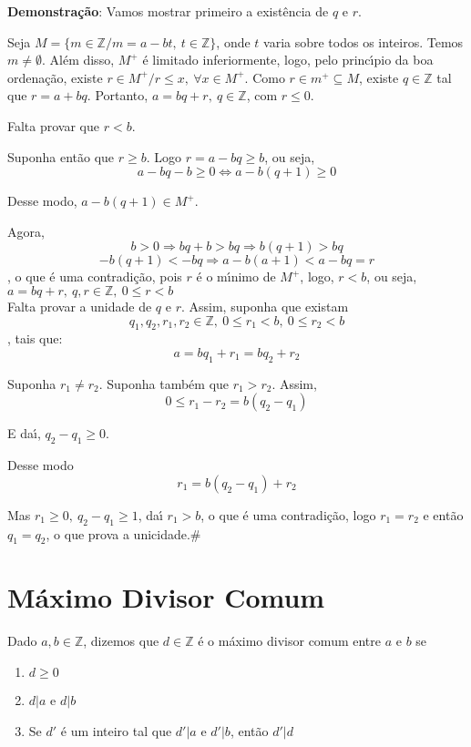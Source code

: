 \textbf{Demonstra{\c c}{\~a}o}: Vamos mostrar primeiro a exist{\^e}ncia de $q$ e $r$.

Seja $M=\{m\in\mathbb{Z}/m=a-bt,\ t\in\mathbb{Z}\}$, onde $t$ varia sobre todos os inteiros. Temos $m\neq\emptyset$. Al{\'e}m disso, $M^{+}$ {\'e} limitado inferiormente, logo, pelo princ{\'\i}pio da boa ordena{\c c}{\~a}o, existe $r\in M^{+}/r\leq x,\ \forall x\in M^{+}$. Como $r\in m^{+}\subseteq M$, existe $q\in\mathbb{Z}$ tal que $r=a+bq$. Portanto, $a=bq+r,\ q\in\mathbb{Z}$, com $r\leq 0$.

Falta provar que $r<b$.

Suponha ent{\~a}o que $r\geq b$. Logo $r=a-bq\geq b$, ou seja,\[a-bq-b\geq 0\Leftrightarrow a-b(q+1)\geq 0\]

Desse modo, $a-b(q+1)\in M^{+}$.

Agora, \[b>0\Rightarrow bq+b>bq\Rightarrow b(q+1)>bq\] \[-b(q+1)<-bq\Rightarrow a-b(a+1)<a-bq=r\], o que {\'e} uma contradi{\c c}{\~a}o, pois $r$ {\'e} o m{\'\i}nimo de $M^{+}$, logo, $r<b$, ou seja, $a=bq+r,\ q,r\in\mathbb{Z},\ 0\leq r<b$\\

Falta provar a unidade de $q$ e $r$. Assim, suponha que existam \[q_{1},q_{2},r_{1},r_{2}\in\mathbb{Z},\ 0\leq r_{1}<b,\ 0\leq r_{2}<b\], tais que:
\[a=bq_{1}+r_{1}=bq_{2}+r_{2}\]

Suponha $r_{1}\neq r_{2}$. Suponha tamb{\'e}m que $r_{1}>r_{2}$. Assim, \[0\leq r_{1}-r_{2}=b(q_{2}-q_{1})\]

E da{\'\i}, $q_{2}-q_{1}\geq 0$.

Desse modo \[r_{1}=b(q_{2}-q_{1})+r_{2}\]

Mas $r_{1}\geq 0,\ q_{2}-q_{1}\geq 1$, da{\'\i} $r_{1}>b$, o que {\'e} uma contradi{\c c}{\~a}o, logo $r_{1}=r_{2}$ e ent{\~a}o $q_{1}=q_{2}$, o que prova a unicidade.\#

\section{M{\'a}ximo Divisor Comum}

\begin{definicao} Dado $a,b\in\mathbb{Z}$, dizemos que $d\in\mathbb{Z}$ {\'e} o m{\'a}ximo divisor comum entre $a$ e $b$ se
\begin{enumerate}
\item $d\geq 0$
\item $d|a$ e $d|b$
\item Se $d'$ {\'e} um inteiro tal que $d'|a$ e $d'|b$, ent{\~a}o $d'|d$ %
\end{enumerate}
\end{definicao}

